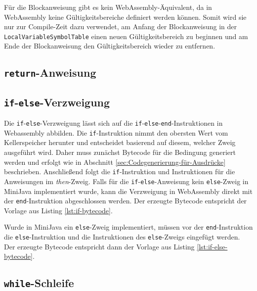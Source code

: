 Für die Blockanweisung gibt es kein WebAssembly-Äquivalent, da in WebAssembly keine Gültigkeitsbereiche definiert werden können. Somit wird sie nur zur Compile-Zeit dazu verwendet, am Anfang der Blockanweisung in der \lstinline{LocalVariableSymbolTable} einen neuen Gültigkeitsbereich zu beginnen und am Ende der Blockanweisung den Gültigkeitsbereich wieder zu entfernen.

\subsection{\lstinline{return}-Anweisung}

\subsection{\lstinline{if}-\lstinline{else}-Verzweigung}
Die \lstinline{if}-\lstinline{else}-Verzweigung lässt sich auf die \lstinline{if}-\lstinline{else}-\lstinline{end}-Instruktionen in Webassembly abbilden. Die \lstinline{if}-Instruktion nimmt den obersten Wert vom Kellerspeicher herunter und entscheidet basierend auf diesem, welcher Zweig ausgeführt wird. Daher muss zunächst Bytecode für die Bedingung generiert werden und erfolgt wie in Abschnitt \ref{sec:Codegenerierung-für-Ausdrücke} beschrieben. Anschließend folgt die \lstinline{if}-Instruktion und Instruktionen für die Anweisungen im \emph{then}-Zweig. Falls für die \lstinline{if}-\lstinline{else}-Anweisung kein \lstinline{else}-Zweig in MiniJava implementiert wurde, kann die Verzweigung in WebAssembly direkt mit der \lstinline{end}-Instruktion abgeschlossen werden. Der erzeugte Bytecode entspricht der Vorlage aus Listing \ref{lst:if-bytecode}.

Wurde in MiniJava ein \lstinline{else}-Zweig implementiert, müssen vor der \lstinline{end}-Instruktion die \lstinline{else}-Instruktion und die Instruktionen des \lstinline{else}-Zweigs eingefügt werden. Der erzeugte Bytecode entspricht dann der Vorlage aus Listing \ref{lst:if-else-bytecode}.





\subsection{\lstinline{while}-Schleife}


